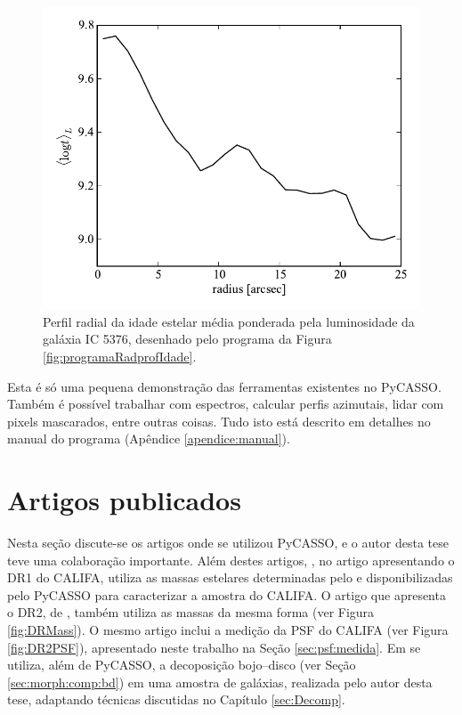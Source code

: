 \begin{figure}
	\includegraphics{figuras/radprof-idade}
	\caption[Perfil radial da idade estelar média da galáxia IC 5376] {Perfil
	radial da idade estelar média ponderada pela luminosidade da galáxia IC
	5376, desenhado pelo programa da Figura \ref{fig:programaRadprofIdade}.}
	\label{fig:radprofIdade}
\end{figure}

Esta é só uma pequena demonstração das ferramentas existentes no PyCASSO. Também
é possível trabalhar com espectros, calcular perfis azimutais, lidar com pixels
mascarados, entre outras coisas. Tudo isto está descrito em detalhes no manual
do programa (Apêndice \ref{apendice:manual}).



\section{Artigos publicados}
\label{sec:pycasso:art}

Nesta seção discute-se os artigos onde se utilizou PyCASSO, e o autor desta tese
teve uma colaboração importante. Além destes artigos, \citet{Husemann2013}, no
artigo apresentando o DR1 do CALIFA, utiliza as massas estelares determinadas
pelo \starlight e disponibilizadas pelo PyCASSO para caracterizar a amostra do
CALIFA.
O artigo que apresenta o DR2, de \citet{GarciaBenito2015}, também utiliza as
massas da mesma forma (ver Figura \ref{fig:DRMass}). O mesmo artigo inclui a
medição da PSF do CALIFA (ver Figura \ref{fig:DR2PSF}), apresentado neste
trabalho na Seção \ref{sec:psf:medida}. Em \citep{GonzalezDelgado2015} se
utiliza, além de PyCASSO, a decoposição bojo--disco (ver Seção
\ref{sec:morph:comp:bd}) em uma amostra de galáxias, realizada pelo autor desta
tese, adaptando técnicas discutidas no Capítulo \ref{sec:Decomp}.

